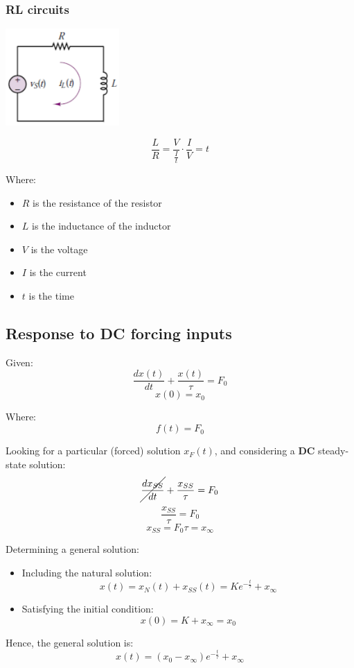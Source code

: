\documentclass[11pt]{article}
\begin{document}
\subsubsection{RL circuits}
\label{sec:orgd1759c7}
\begin{center}
\includegraphics[height=10em]{./images/rl-circuit-diagram.png}
\end{center}
\[\frac{L}{R} = \frac{V}{\frac{I}{t}} \cdot \frac{I}{V} = t\]

Where:
\begin{itemize}
\item \(R\) is the resistance of the resistor
\item \(L\) is the inductance of the inductor
\item \(V\) is the voltage
\item \(I\) is the current
\item \(t\) is the time
\end{itemize}

 \newpage
\subsection{Response to DC forcing inputs}
\label{sec:orgdf8b0c3}
Given:
\[\frac{dx (t)}{dt} + \frac{x(t)}{\tau} = F_0\]
\[x(0) = x_0\]

Where:
\[f(t) = F_0\]

Looking for a particular (forced) solution \(x_F (t)\), and considering a \textbf{DC} steady-state solution:
\[\cancel{\frac{dx_{SS}}{dt}} + \frac{x_{SS}}{\tau} = F_0\]
\[\frac{x_{SS}}{\tau} = F_0\]
\[x_{SS} = F_0 \tau = x_{\infty}\]

Determining a general solution:
\begin{itemize}
\item Including the natural solution:
\[x(t) = x_N (t) + x_{SS} (t) = Ke^{- \frac{t}{\tau}} + x_{\infty}\]
\item Satisfying the initial condition:
\[x(0) = K + x_{\infty} = x_0\]
\end{itemize}

Hence, the general solution is:
\[x(t) = (x_0 - x_{\infty}) e^{-\frac{t}{\tau}} + x_{\infty}\]
\end{document}

